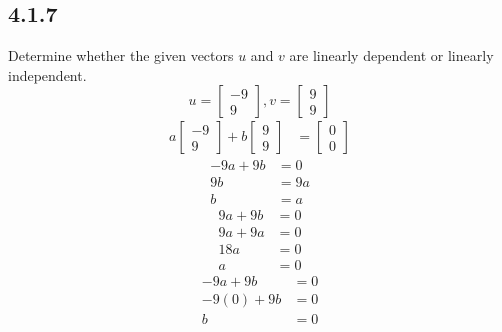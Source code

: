 \documentclass{article}
\begin{document}
\subsection{4.1.7}
Determine whether the given vectors $ u $ and $ v $ are linearly dependent or linearly independent.
$$
	u =
		\begin{bmatrix}
			-9 \\
			9
		\end{bmatrix},
	v =
		\begin{bmatrix}
			9 \\
			9
		\end{bmatrix}
$$
\begin{align*}
	a \begin{bmatrix} -9 \\ 9 \end{bmatrix} + b \begin{bmatrix} 9 \\ 9 \end{bmatrix} & = \begin{bmatrix} 0 \\ 0 \end{bmatrix}
\end{align*}
\begin{align*}
	-9a + 9b & = 0 \\
	9b & = 9a \\
	b & = a
\end{align*}
\begin{align*}
	9a + 9b & = 0 \\
	9a + 9a & = 0 \\
	18a & = 0 \\
	a & = 0
\end{align*}
\begin{align*}
	-9a + 9b & = 0 \\
	-9(0) + 9b & = 0 \\
	b & = 0
\end{align*}
\end{document}
